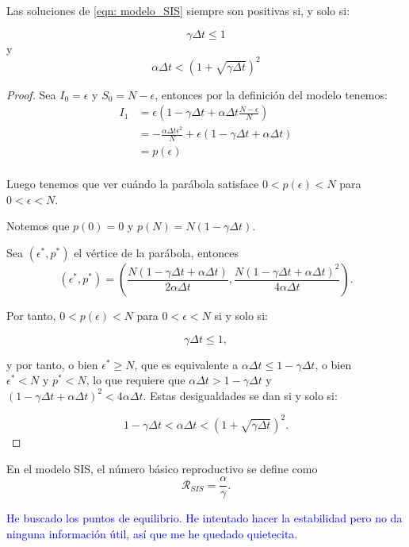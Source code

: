 \begin{proposition}
Las soluciones de \eqref{eqn: modelo_SIS} siempre son positivas si, y solo si:

$$\gamma \Delta t \leq 1 $$ y $$\alpha\Delta t< \left( 1+\sqrt{\gamma \Delta t} \right)^2$$

\end{proposition}
\begin{proof}
Sea $I_0=\epsilon$ y $S_0=N-\epsilon$, entonces por la definición del modelo tenemos:
\begin{equation}
\begin{aligned}
I_1 & =\epsilon\left(1-\gamma\Delta t+\alpha\Delta t\frac{N-\epsilon}{N}\right) \\
& = -\frac{\alpha\Delta t \epsilon^2}{N} + \epsilon(1-\gamma\Delta t+\alpha\Delta t ) \\
& = p(\epsilon) \\
\end{aligned}
\end{equation}

Luego tenemos que ver cuándo la parábola satisface $0<p(\epsilon)<N$ para $0<\epsilon<N$.

Notemos que $p(0)=0$ y $p(N)=N(1-\gamma\Delta t).$

Sea $(\epsilon^*, p^*)$ el vértice de la parábola, entonces 
$$(\epsilon^*, p^*) = \left(\frac{N(1-\gamma\Delta t+\alpha\Delta t)}{2\alpha\Delta t}, \frac{N(1-\gamma\Delta t+\alpha\Delta t)^2}{4\alpha\Delta t}\right).$$

Por tanto, $0<p(\epsilon )<N$ para $0<\epsilon <N$ si y solo si:

$$\gamma\Delta t \leq 1,$$

y por tanto, o bien $\epsilon^* \geq N$, que es equivalente a $\alpha\Delta t \leq 1-\gamma\Delta t$, o bien $\epsilon^*<N \text{  y  } p^*<N$, lo que requiere que $\alpha\Delta t > 1-\gamma\Delta t$ y $(1-\gamma\Delta t+\alpha\Delta t)^2<4\alpha\Delta t$. Estas desigualdades se dan si y solo si:

$$1-\gamma\Delta t < \alpha \Delta t < \left( 1+\sqrt{\gamma \Delta t} \right)^2.$$

\end{proof}

En el modelo SIS, el número básico reproductivo se define como 
$$\mathcal{R}_{SIS}=\frac{\alpha}{\gamma}.$$

\textcolor{blue}{He buscado los puntos de equilibrio. He intentado hacer la estabilidad pero no da ninguna información útil, así que me he quedado quietecita.}


